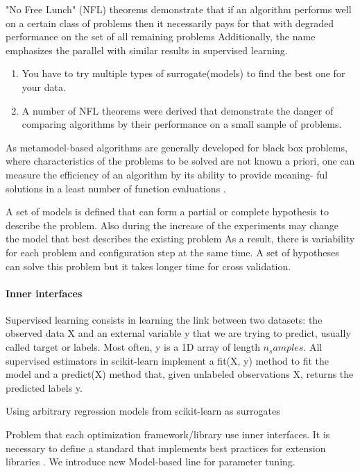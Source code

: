 "No Free Lunch" (NFL) theorems demonstrate that if an algorithm performs well on a certain class of problems then it necessarily pays for that with degraded performance on the set of all remaining problems Additionally, the name emphasizes the parallel with similar results in supervised learning.
\begin{enumerate}
    \item You have to try multiple types of surrogate(models) to find the best one for your data.
    \item A number of NFL theorems were derived that demonstrate the danger of comparing algorithms by their performance on a small sample of problems.
\end{enumerate}

As metamodel-based algorithms are generally developed for black box problems, where characteristics of the problems to be solved are not known a priori, one can measure the efficiency of an algorithm by its ability to provide meaning- ful solutions in a least number of function evaluations \cite{SoftSurvey}.

A set of models is defined that can form a partial or complete hypothesis to describe the problem.
Also during the increase of the experiments may change the model that best describes the existing problem
As a result, there is variability for each problem and configuration step at the same time. 
A set of hypotheses can solve this problem but it takes longer time for cross validation.

\paragraph{Inner interfaces} 
    Supervised learning consists in learning the link between two datasets: 
    the observed data X and an external variable y that we are trying to predict, usually called target or labels. Most often, y is a 1D array of length $n_samples$.
    All supervised estimators in scikit-learn implement a fit(X, y) method to fit the model and a predict(X) method that, given unlabeled observations X, returns the predicted labels y.

    Using arbitrary regression models from scikit-learn as surrogates

    Problem that each optimization framework/library use inner interfaces. 
    It is necessary to define a standard that implements best practices for extension libraries \cite{buitinck2013api}.
    We introduce new Model-based line for parameter tuning. 

